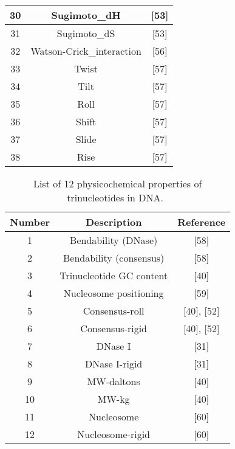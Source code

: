 \begin{footnotesize}
\begin{longtable}{ccc}
        30 & Sugimoto\_dH	& [53] \\\midrule
        31 & Sugimoto\_dS	& [53] \\\midrule
        32 & Watson-Crick\_interaction	& [56] \\\midrule
        33 & Twist	& [57] \\\midrule
        34 & Tilt	& [57] \\\midrule
        35 & Roll	& [57] \\\midrule
        36 & Shift	& [57] \\\midrule
        37 & Slide	& [57] \\\midrule
        38 & Rise	& [57] \\
        
        \bottomrule
        
    \end{longtable}
\end{footnotesize}
    
\begin{footnotesize}
    \begin{longtable}{ccc}
        \caption{List of 12 physicochemical properties of trinucleotides in DNA.~\cite{Chen2014PseKNC:Composition}}
        \label{tab:12_tri}
        \endfirsthead
        \endhead
        \toprule
        \textbf{Number} & \textbf{Description} & \textbf{Reference}\\\midrule
        
        1	& Bendability (DNase)	& [58]\\\midrule
        2	& Bendability (consensus)	& [58]\\\midrule
        3	& Trinucleotide GC content	& [40]\\\midrule
        4	& Nucleosome positioning	& [59]\\\midrule
        5	& Consensus-roll	& [40], [52]\\\midrule
        6	& Consensus-rigid	& [40], [52]\\\midrule
        7	& DNase I	& [31]\\\midrule
        8	& DNase I-rigid	& [31]\\\midrule
        9	& MW-daltons	& [40]\\\midrule
        10	& MW-kg &	[40]\\\midrule
        11	& Nucleosome	& [60]\\\midrule
        12	& Nucleosome-rigid	& [60]\\
        
        \bottomrule
        
    \end{longtable}
\end{footnotesize}


